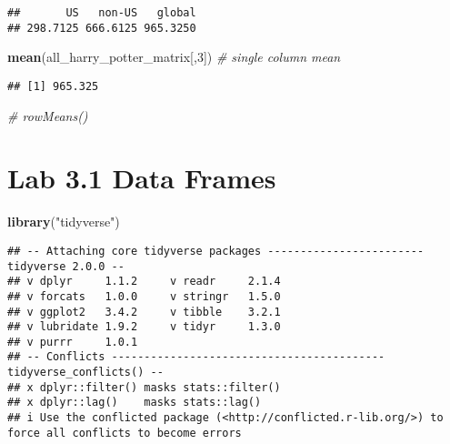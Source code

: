 \documentclass[
]{article}
\newenvironment{Shaded}{\begin{snugshade}}{\end{snugshade}}
\newcommand{\CommentTok}[1]{\textcolor[rgb]{0.56,0.35,0.01}{\textit{#1}}}
\newcommand{\DecValTok}[1]{\textcolor[rgb]{0.00,0.00,0.81}{#1}}
\newcommand{\FunctionTok}[1]{\textcolor[rgb]{0.13,0.29,0.53}{\textbf{#1}}}
\newcommand{\NormalTok}[1]{#1}
\newcommand{\StringTok}[1]{\textcolor[rgb]{0.31,0.60,0.02}{#1}}
\begin{document}
\begin{verbatim}
##       US   non-US   global 
## 298.7125 666.6125 965.3250
\end{verbatim}

\begin{Shaded}
\begin{Highlighting}[]
\FunctionTok{mean}\NormalTok{(all\_harry\_potter\_matrix[,}\DecValTok{3}\NormalTok{]) }\CommentTok{\# single column mean}
\end{Highlighting}
\end{Shaded}

\begin{verbatim}
## [1] 965.325
\end{verbatim}

\begin{Shaded}
\begin{Highlighting}[]
\CommentTok{\# rowMeans()}
\end{Highlighting}
\end{Shaded}

\hypertarget{lab-3.1-data-frames}{%
\section{Lab 3.1 Data Frames}\label{lab-3.1-data-frames}}

\begin{Shaded}
\begin{Highlighting}[]
 \FunctionTok{library}\NormalTok{(}\StringTok{"tidyverse"}\NormalTok{)}
\end{Highlighting}
\end{Shaded}

\begin{verbatim}
## -- Attaching core tidyverse packages ------------------------ tidyverse 2.0.0 --
## v dplyr     1.1.2     v readr     2.1.4
## v forcats   1.0.0     v stringr   1.5.0
## v ggplot2   3.4.2     v tibble    3.2.1
## v lubridate 1.9.2     v tidyr     1.3.0
## v purrr     1.0.1     
## -- Conflicts ------------------------------------------ tidyverse_conflicts() --
## x dplyr::filter() masks stats::filter()
## x dplyr::lag()    masks stats::lag()
## i Use the conflicted package (<http://conflicted.r-lib.org/>) to force all conflicts to become errors
\end{verbatim}
\end{document}
